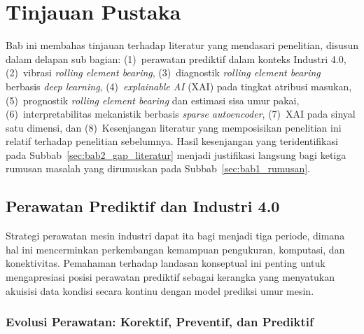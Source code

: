 \chapter{Tinjauan Pustaka}
\label{bab:tinjauan-pustaka}

Bab ini membahas tinjauan terhadap literatur yang mendasari penelitian,
{\color{blue}disusun dalam delapan sub bagian:
(1)~perawatan prediktif dalam konteks Industri 4.0,
(2)~vibrasi \emph{rolling element bearing},
(3)~diagnostik \emph{rolling element bearing} berbasis \emph{deep learning},
(4)~\emph{explainable AI} (XAI) pada tingkat atribusi masukan,
(5)~prognostik \emph{rolling element bearing} dan estimasi sisa umur pakai,
(6)~interpretabilitas mekanistik berbasis \emph{sparse autoencoder},
(7)~XAI pada sinyal satu dimensi, dan
(8)~Kesenjangan literatur yang memposisikan penelitian ini relatif
terhadap penelitian sebelumnya.}
Hasil kesenjangan yang teridentifikasi
pada Subbab~\ref{sec:bab2_gap_literatur} menjadi {\color{blue}justifikasi langsung bagi
ketiga rumusan masalah} yang dirumuskan pada {\color{blue}Subbab~\ref{sec:bab1_rumusan}}.


\section{Perawatan Prediktif dan Industri 4.0}
\label{sec:bab2_pdm_industri}

Strategi perawatan mesin industri dapat ita bagi menjadi tiga periode, dimana hal ini  
mencerminkan perkembangan kemampuan pengukuran, komputasi, dan konektivitas.
Pemahaman terhadap landasan konseptual ini penting untuk mengapresiasi
posisi perawatan prediktif sebagai kerangka yang menyatukan akuisisi data kondisi
secara kontinu dengan model prediksi umur mesin.

\subsection{Evolusi Perawatan: Korektif, Preventif, dan Prediktif}
\label{subsec:bab2_evolusi_perawatan}

